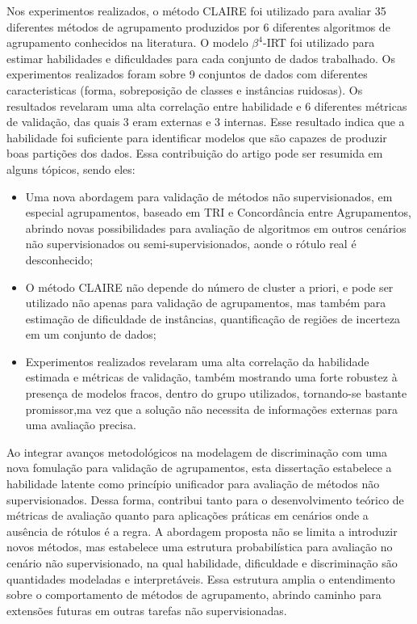 Nos experimentos realizados, o método \gls{CLAIRE} \cite{ferreira2025claire} foi utilizado para avaliar 35 diferentes métodos de agrupamento produzidos por 6 diferentes algoritmos de agrupamento conhecidos na literatura. O modelo $\beta^{4}$-\gls{IRT} \cite{ferreirajunior2023beta4irtnewbeta3irtenhanced} foi utilizado para estimar habilidades e dificuldades para cada conjunto de dados trabalhado. Os experimentos realizados foram sobre 9 conjuntos de dados com diferentes caracteristicas (forma, sobreposição de classes e instâncias ruidosas). Os resultados revelaram uma alta correlação entre habilidade e 6 diferentes métricas de validação, das quais 3 eram externas e 3 internas. Esse resultado indica que a habilidade foi suficiente para identificar modelos que são capazes de produzir boas partições dos dados. Essa contribuição do artigo pode ser resumida em alguns tópicos, sendo eles:

\begin{itemize}
    \item Uma nova abordagem para validação de métodos não supervisionados, em especial agrupamentos, baseado em \gls{TRI} e Concordância entre Agrupamentos, abrindo novas possibilidades para avaliação de algoritmos em outros cenários não supervisionados ou semi-supervisionados, aonde o rótulo real é desconhecido;

    \item O método \gls{CLAIRE} não depende do número de cluster a priori, e pode ser utilizado não apenas para validação de agrupamentos, mas também para estimação de dificuldade de instâncias, quantificação de regiões de incerteza em um conjunto de dados;
    
    \item Experimentos realizados revelaram uma alta correlação  da habilidade estimada e métricas de validação, também mostrando uma forte robustez à presença de modelos fracos, dentro do grupo utilizados, tornando-se bastante promissor,ma vez que a solução não necessita de informações externas para uma avaliação precisa.

\end{itemize}

Ao integrar avanços metodológicos na modelagem de discriminação com uma nova fomulação para validação de agrupamentos, esta dissertação estabelece a habilidade latente como princípio unificador para avaliação de métodos não supervisionados. Dessa forma, contribui tanto para o desenvolvimento teórico de métricas de avaliação quanto para aplicações práticas em cenários onde a ausência de rótulos é a regra. A abordagem proposta não se limita a introduzir novos métodos, mas estabelece uma estrutura probabilística para avaliação no cenário não supervisionado, na qual habilidade, dificuldade e discriminação são quantidades modeladas e interpretáveis. Essa estrutura amplia o entendimento sobre o comportamento de métodos de agrupamento, abrindo caminho para extensões futuras em outras tarefas não supervisionadas.


 
 
